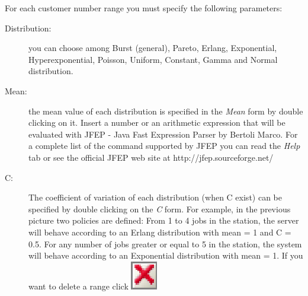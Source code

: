 For each customer number range you must specify the following parameters:
\begin{description}
\item [Distribution:] you can choose among Burst (general),
Pareto, Erlang, Exponential, Hyperexponential, Poisson, Uniform,
Constant, Gamma and Normal distribution. \item [Mean:] the mean
value of each distribution is specified in the \emph{Mean} form by
double clicking on it. Insert a number or an arithmetic expression
that will be evaluated with JFEP - Java Fast Expression Parser by
Bertoli Marco. For a complete list of the command supported by
JFEP you can read the \emph{Help} tab or see the official JFEP web
site at http://jfep.sourceforge.net/ \item [C:] The coefficient of
variation of each distribution (when C exist) can be specified by
double clicking on the \emph{C} form. For example, in the previous
picture two policies are defined: From 1 to 4 jobs in the station,
the server will behave according to an Erlang distribution with
mean = 1 and C = 0.5. For any number of jobs greater or equal to 5
in the station, the system will behave according to an Exponential
distribution with mean = 1. If you want to delete a range click
\includegraphics[scale=.5]{img/jsim/delete.eps}
\end{description}

